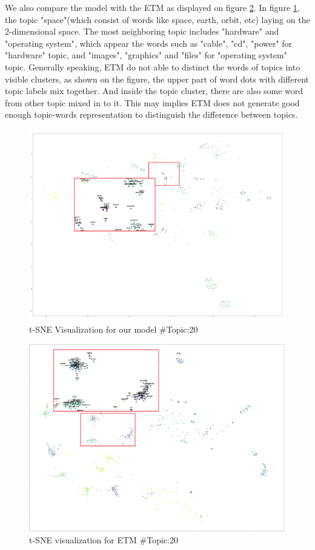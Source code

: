 We also compare the model with the ETM as displayed on figure \ref{fig:tsne20t50w1_etm}. In figure \ref{fig:tsne20t25w2}, the topic "space"(which consist of words like space, earth, orbit, etc) laying on the 2-dimensional space. The most neighboring topic includes "hardware" and "operating system", which appear the words such as "cable", "cd", "power" for "hardware" topic, and "images", "graphics" and "files" for "operating system" topic. Generally speaking, ETM do not able to distinct the words of topics into visible clusters, as shown on the figure, the upper part of word dots with different topic labels mix together. And inside the topic cluster, there are also some word from other topic mixed in to it. This may implies ETM does not generate good enough topic-words representation to distinguish the difference between topics.
\begin{figure}
\centering
\includegraphics[width=1\linewidth]{figures/0908/tsne_20t_25w_2}
\caption{t-SNE Visualization for our model \#Topic:20}
\label{fig:tsne20t25w2}
\end{figure}
\begin{figure}
\centering
\includegraphics[width=1\linewidth]{"figures/0106/tsne_20t_50w_2"}
\caption{t-SNE visualization for ETM \#Topic:20}
\label{fig:tsne20t50w1_etm}
\end{figure}
